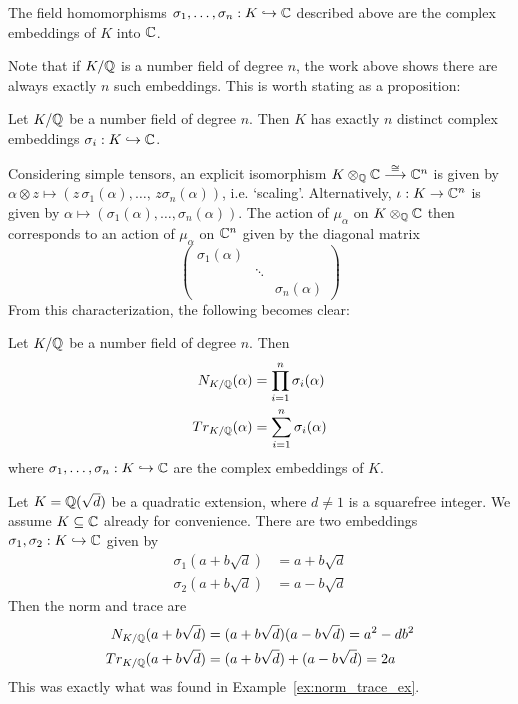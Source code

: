 \begin{dfn}
The field homomorphisms $\sigma_1,\ldots,\sigma_n: K \hookrightarrow \mathbb{C}$ described above are the complex embeddings of $K$ into $\mathbb{C}$.
\end{dfn}


Note that if $K/\mathbb{Q}$ is a number field of degree $n$, the work above shows there are always exactly $n$ such embeddings. This is worth stating as a proposition:


\begin{prop}
Let $K/\mathbb{Q}$ be a number field of degree $n$. Then $K$ has exactly $n$ distinct complex embeddings $\sigma_i: K \hookrightarrow \mathbb{C}$. 
\end{prop}


Considering simple tensors, an explicit isomorphism $K \otimes_{\mathbb{Q}} \mathbb{C} \stackrel{\cong}{\longrightarrow} \mathbb{C}^n$ is given by $\alpha \otimes z \mapsto (z\,\sigma_1(\alpha), \ldots, \,z\sigma_n(\alpha))$, i.e. `scaling'. Alternatively, $\iota: K \to \mathbb{C}^n$ is given by $\alpha \mapsto (\sigma_1(\alpha), \ldots, \sigma_n(\alpha))$. The action of $\mu_\alpha$ on $K \otimes_{\mathbb{Q}} \mathbb{C}$ then corresponds to an action of $\mu_\alpha$ on $\mathbb{C}^n$ given by the diagonal matrix
	\[
	\begin{pmatrix}
	\sigma_1(\alpha) & & \\
	& \ddots & \\
	& & \sigma_n(\alpha)
	\end{pmatrix}
	\]
From this characterization, the following becomes clear:


\begin{prop} \label{prop:embed_tracenorm}
Let $K/\mathbb{Q}$ be a number field of degree $n$. Then 
	\[
	\begin{split}
	N_{K/\mathbb{Q}}(\alpha)&= \prod_{i=1}^n \sigma_i(\alpha) \\
	Tr_{K/\mathbb{Q}}(\alpha)&= \sum_{i=1}^n \sigma_i(\alpha)
	\end{split}
	\]
where $\sigma_1, \ldots, \sigma_n: K \hookrightarrow \mathbb{C}$ are the complex embeddings of $K$.
\end{prop}


\begin{ex}
Let $K= \mathbb{Q}(\sqrt{d})$ be a quadratic extension, where $d \neq 1$ is a squarefree integer. We assume $K \subseteq \mathbb{C}$ already for convenience. There are two embeddings $\sigma_1, \sigma_2: K \hookrightarrow \mathbb{C}$ given by
	\[
	\begin{split}
	\sigma_1(a + b\sqrt{d})&= a + b\sqrt{d} \\
	\sigma_2(a + b\sqrt{d})&= a - b\sqrt{d}
	\end{split}
	\]
Then the norm and trace are
	\[
	\begin{split}
	N_{K/\mathbb{Q}}(a + b\sqrt{d})&= (a + b\sqrt{d}) (a - b\sqrt{d})= a^2 - db^2 \\
	Tr_{K/\mathbb{Q}}(a + b\sqrt{d})&= (a + b\sqrt{d}) + (a - b\sqrt{d})= 2a
	\end{split}
	\] 
This was exactly what was found in Example~\ref{ex:norm_trace_ex}. \xqed \pskip
\end{ex}


